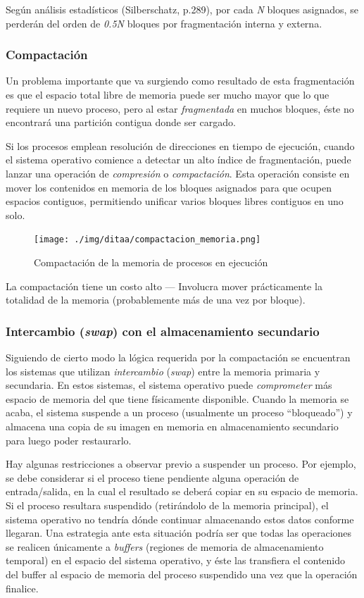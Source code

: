 \documentclass[11pt,fleqn]{book} %
\begin{document}
Según análisis estadísticos (Silberschatz, p.289), por cada \emph{N}
bloques asignados, se perderán del orden de \emph{0.5N} bloques por
fragmentación interna y externa.
\subsubsection{Compactación}
\label{sec-5-2-1-2}


Un problema importante que va surgiendo como resultado de esta
fragmentación es que el espacio total libre de memoria puede ser mucho
mayor que lo que requiere un nuevo proceso, pero al estar
\emph{fragmentada} en muchos bloques, éste no encontrará una partición
contigua donde ser cargado.

Si los procesos emplean resolución de direcciones en tiempo de
ejecución, cuando el sistema operativo comience a detectar un alto
índice de fragmentación, puede lanzar una operación de \emph{compresión} o
\emph{compactación}. Esta operación consiste en mover los contenidos en 
memoria de los bloques asignados para que ocupen espacios contiguos, 
permitiendo unificar varios bloques libres contiguos en uno solo.

\begin{figure}[htb]
\centering
\texttt{[image: ./img/ditaa/compactacion\_memoria.png]}
\caption{\label{MEM_compactacion_memoria}Compactación de la memoria de procesos en ejecución}
\end{figure}

La compactación tiene un costo alto — Involucra mover prácticamente la
totalidad de la memoria (probablemente más de una vez por bloque).
\subsubsection{Intercambio (\emph{swap}) con el almacenamiento secundario}
\label{sec-5-2-1-3}
\label{MEM_swap}


Siguiendo de cierto modo la lógica requerida por la compactación
se encuentran los sistemas que utilizan \emph{intercambio} (\emph{swap}) entre la
memoria primaria y secundaria. En estos sistemas, el sistema operativo
puede \emph{comprometer} más espacio de memoria del que tiene físicamente
disponible. Cuando la memoria se acaba, el
sistema suspende a un proceso (usualmente un proceso ``bloqueado'')
y almacena una copia de su imagen en memoria en almacenamiento secundario 
para luego poder restaurarlo.

Hay algunas restricciones a observar previo a suspender un proceso.
Por ejemplo, se debe considerar si el proceso tiene pendiente alguna 
operación de entrada/salida, en la cual el resultado se deberá copiar 
en su espacio de memoria. Si el proceso resultara suspendido
(retirándolo de la memoria principal), el sistema operativo no tendría
dónde continuar almacenando estos datos conforme llegaran.
Una estrategia ante esta situación podría ser 
que todas las operaciones se realicen únicamente a \emph{buffers} (regiones de
memoria de almacenamiento temporal) en el espacio del sistema operativo,
y éste las transfiera el contenido del buffer al espacio de memoria del  
proceso suspendido una vez que la operación finalice.
\end{document}
